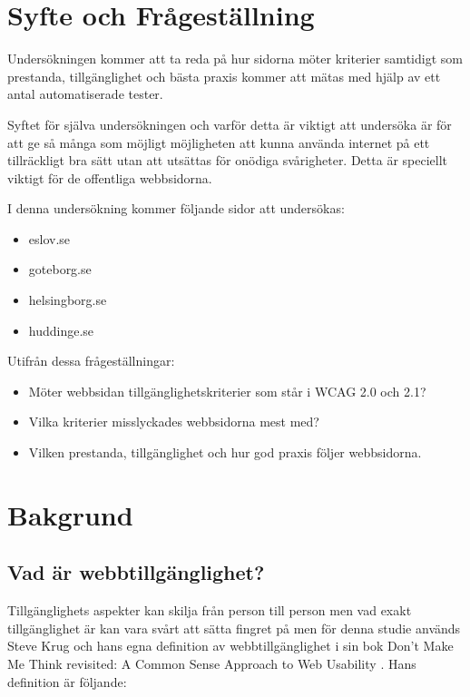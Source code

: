\documentclass[11p]{article}
\begin{document}
    \section{Syfte och Frågeställning}
    Undersökningen kommer att ta reda på hur sidorna möter kriterier samtidigt som prestanda, tillgänglighet och bästa praxis kommer att mätas med hjälp av ett antal automatiserade tester.

    Syftet för själva undersökningen och varför detta är viktigt att undersöka är för att ge så många som möjligt möjligheten att kunna använda internet på ett tillräckligt bra sätt utan att utsättas för onödiga svårigheter.
    Detta är speciellt viktigt för de offentliga webbsidorna.

    I denna undersökning kommer följande sidor att undersökas:

    \begin{itemize}
        \item eslov.se
        \item goteborg.se
        \item helsingborg.se
        \item huddinge.se
    \end{itemize}

    Utifrån dessa frågeställningar:

    \begin{itemize}
        \item Möter webbsidan tillgänglighetskriterier som står i WCAG 2.0 och 2.1?
        \item Vilka kriterier misslyckades webbsidorna mest med?
        \item Vilken prestanda, tillgänglighet och hur god praxis följer webbsidorna.
    \end{itemize}
    
    \section{Bakgrund}
    
    \subsection{Vad är webbtillgänglighet?}
    Tillgänglighets aspekter kan skilja från person till person men vad exakt tillgänglighet är kan vara svårt att sätta fingret på men för denna studie används Steve Krug och hans egna definition av webbtillgänglighet i sin bok Don't Make Me Think revisited: A Common Sense Approach to Web Usability \textcite{Krug}.
    Hans definition är följande:
\end{document}
